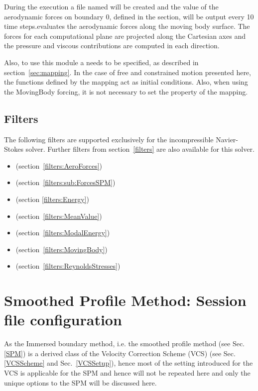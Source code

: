 During the execution a file named  will be created and the
value of the aerodynamic forces on boundary 0, defined in the
 section, will be output every 10 time steps.evaluates the aerodynamic forces along the moving body surface. The
forces for each computational plane are projected along the Cartesian axes and the pressure and viscous contributions are computed in each direction.

Also, to use this module a  needs to be specified, as described in section~\ref{sec:mapping}. In the case of free and constrained motion presented here, the functions defined by the mapping act as initial conditions. Also, when using the MovingBody forcing, it is not necessary to set the  property of the mapping. 

\subsection{Filters}
The following filters are supported exclusively for the incompressible
Navier-Stokes solver. Further filters from section~\ref{filters} are also
available for this solver.

\begin{itemize}
  \item {} (section~\ref{filters:AeroForces})
  \item {} (section~\ref{filters:sub:ForcesSPM})
  \item {} (section \ref{filters:Energy})
  \item {} (section~\ref{filters:MeanValue})
  \item {} (section~\ref{filters:ModalEnergy})
  \item {} (section~\ref{filters:MovingBody})
  \item {} (section~\ref{filters:ReynoldsStresses})
\end{itemize}


\section{Smoothed Profile Method: Session file configuration}
As the Immersed boundary method, i.e. the smoothed profile method (see Sec.~
\ref{SPM}) is a derived class of the Velocity Correction Scheme (VCS) (see Sec.~
\ref{VCSScheme} and Sec.~\ref{VCSSetup}), hence most of the setting introduced 
for the VCS is applicable for the SPM and hence will not be repeated here and
only the unique options to the SPM will be discussed here.

